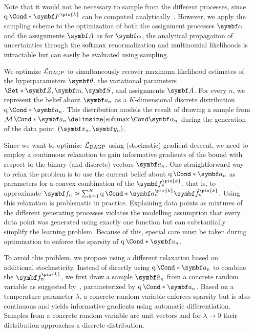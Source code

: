 Note that it would not be necessary to sample from the different processes, since $\Variat*{\mat{F^{\pix{k}}}}$ can be computed analytically~\parencite{hensman_gaussian_2013}.
However, we apply the sampling scheme to the optimization of both the assignment processes $\mat{\alpha}$ and the assignments $\mat{A}$ as for $\mat{\alpha}$, the analytical propagation of uncertainties through the $\operatorname{softmax}$ renormalization and multinomial likelihoods is intractable but can easily be evaluated using sampling.

We optimize $\mathcal{L}_{\text{DAGP}}$ to simultaneously recover maximum likelihood estimates of the hyperparameters $\mat{\theta}$, the variational parameters $\Set*{\mat{Z}, \mat{m}, \mat{S}}$, and assignments $\mat{A}$.
For every $n$, we represent the belief about $\mat{a_n}$ as a $K$-dimensional discrete distribution $\Variat*{\mat{a_n}}$.
This distribution models the result of drawing a sample from $\Multinomial*{\mat{a_n} \given \Fun{\softmax}{\mat{\alpha_n}}}$ during the generation of the data point $(\mat{x_n}, \mat{y_n})$.

Since we want to optimize $\mathcal{L}_{\text{DAGP}}$ using (stochastic) gradient descent, we need to employ a continuous relaxation to gain informative gradients of the bound with respect to the binary (and discrete) vectors $\mat{a_n}$.
One straightforward way to relax the problem is to use the current belief about $\Variat*{\mat{a_n}}$ as parameters for a convex combination of the $\mat{f_n^{\pix{k}}}$, that is, to approximate $\mat{f_n} \approx \sum_{k=1}^K \Variat*{\mat{a_n^{\pix{k}}}}\mat{\hat{f}_n^{\pix{k}}}$.
Using this relaxation is problematic in practice.
Explaining data points as mixtures of the different generating processes violates the modelling assumption that every data point was generated using exactly one function but can substantially simplify the learning problem.
Because of this, special care must be taken during optimization to enforce the sparsity of $\Variat*{\mat{a_n}}$.

To avoid this problem, we propose using a different relaxation based on additional stochasticity.
Instead of directly using $\Variat*{\mat{a_n}}$ to combine the $\mat{f_n^{\pix{k}}}$, we first draw a sample $\mat{\hat{a}_n}$ from a concrete random variable as suggested by~\textcite{maddison_concrete_2016}, parameterized by $\Variat*{\mat{a_n}}$.
Based on a temperature parameter $\lambda$, a concrete random variable enforces sparsity but is also continuous and yields informative gradients using automatic differentiation.
Samples from a concrete random variable are unit vectors and for $\lambda \to 0$ their distribution approaches a discrete distribution.

